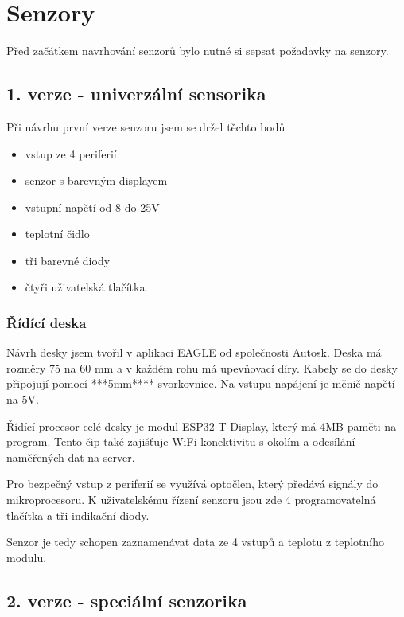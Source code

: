 \chapter{Senzory}

Před začátkem navrhování senzorů bylo nutné si sepsat požadavky na senzory.




\section{1. verze - univerzální sensorika}

Při návrhu první verze senzoru jsem se držel těchto bodů
\begin{itemize}
    \item vstup ze 4 periferií
    \item senzor s barevným displayem
    \item vstupní napětí od 8 do 25V
    \item teplotní čidlo
    \item tři barevné diody
    \item čtyři uživatelská tlačítka
\end{itemize}


\subsection{Řídící deska}
Návrh desky jsem tvořil v aplikaci EAGLE od společnosti Autosk. 
Deska má rozměry 75 na 60 mm a v každém rohu má upevňovací díry. 
Kabely se do desky připojují pomocí ***5mm**** svorkovnice.
Na vstupu napájení je měnič napětí na 5V. 

Řídící procesor celé desky je modul ESP32 T-Display, který má 4MB paměti na program.
Tento čip také zajišťuje WiFi konektivitu s okolím a odesílání naměřených dat na server.

Pro bezpečný vstup z periferií se využívá optočlen, který předává signály do mikroprocesoru.
\fxnote[author=JA]{\textcolor{mygreen}{Optočlen}}
K uživatelskému řízení senzoru jsou zde 4 programovatelná tlačítka a tři indikační diody.

Senzor je tedy schopen zaznamenávat data ze 4 vstupů a teplotu z teplotního modulu.

\fxnote[author=JA]{\textcolor{mygreen}{krabička popis, uchycení}}
\fxnote[author=JA]{\textcolor{mygreen}{Obrázek deksa => krabička}}

\newpage

\section{2. verze - speciální senzorika}

